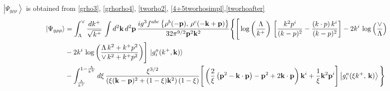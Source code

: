 \documentclass[aps,prd,amsmath,amssymb,nofootinbib]{revtex4-2}
\numberwithin{equation}{section}
\begin{document}
$\left|\Psi_{g\rho\rho}\right\rangle$ is obtained from \eqref{grho3}, \eqref{grhorho4}, \eqref{tworho2}, \eqref{4+5tworhosimpl},\eqref{tworhoafter}
\begin{align}\label{combinedgrhorho}
    \left|\Psi_{g\rho\rho}\right\rangle & =  \int_{\Lambda}^{\vee}\frac{dk^{+}}{\sqrt{k^{+}}}\,\int d^{2}\mathbf{k}\, d^{2}\mathbf{p}\,\frac{ig^{3}f^{abc}\left\{ \rho^{b}(-\mathbf{p}),\,\rho^{c}(-\mathbf{k}+\mathbf{p})\right\}}{32\pi^{9/2}\mathbf{p}^{2}\mathbf{k}^{2}}\Bigg\{\Bigg[\log{\left(\frac{\Lambda}{k^{+}}\right)}\,\left[\frac{k^{2}p^{i}}{(k-p)^{2}}-\frac{(k\cdot p)\,k^{i}}{(k-p)^{2}}\right]-2k^{i}\,\log{\left(\frac{\vee}{\Lambda}\right)}\notag \\ & -2k^{i}\,\log{\left(\frac{\Lambda\,k^{2} + k^{+}p^{2}}{\vee\, k^{2}+k^{+}p^{2}}\right)}\Bigg]\, \ket{g^{a}_{i}(k^{+},\mathbf{k})} \notag \\ & -\int_{\frac{\Lambda}{k^{+}}}^{1-\frac{\Lambda}{k^{+}}}d\xi\,\frac{\xi^{3/2}}{\left(\xi(\mathbf{k}-\mathbf{p})^{2}+(1-\xi)\mathbf{k}^{2}\right)(1-\xi)}\Bigg[\left(\frac{2}{\xi}\left(\mathbf{p}^{2}-\mathbf{k}\cdot\mathbf{p}\right)-\mathbf{p}^{2}+2\mathbf{k}\cdot\mathbf{p}\right)\mathbf{k}^{i} +\frac{1}{\xi}\mathbf{k}^{2}\mathbf{p}^{i}\Bigg]\left|g_{i}^{a}(\xi k^{+},\,\mathbf{k})\right\rangle \Bigg\} 
\end{align}
\end{document}
